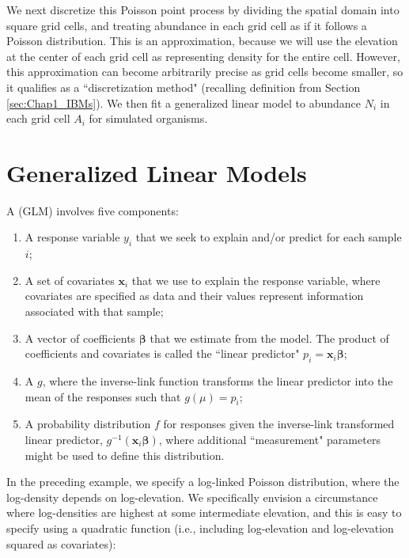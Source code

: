 We next discretize this Poisson point process by dividing the spatial domain into square grid cells, and treating abundance in each grid cell as if it follows a Poisson distribution.  This is an approximation, because we will use the elevation at the center of each grid cell as representing density for the entire cell.  However, this approximation can become arbitrarily precise as grid cells become smaller, so it qualifies as a ``discretization method" (recalling definition from Section \ref{sec:Chap1_IBMs}).  We then fit a generalized linear model to abundance \(N_i\) in each grid cell \(A_i\) for simulated organisms.  

\section{Generalized Linear Models} \label{sec:Chap1_GLM}

A  (GLM) involves five components:

\begin{enumerate}
    \item A response variable \(y_i\) that we seek to explain and/or predict for each sample \(i\);
    \item A set of covariates \( \mathbf{x}_i\) that we use to explain the response variable, where covariates are specified as data and their values represent information associated with that sample;
    \item A vector of coefficients \( \mathbf{\beta} \) that we estimate from the model.  The product of coefficients and covariates is called the ``linear predictor" \( p_i = \mathbf{x}_i \mathbf{\beta} \);
    \item A  \(g\), where the inverse-link function transforms the linear predictor into the mean of the responses such that \(g(\mu) = p_i\);
    \item A probability distribution \(f\) for responses given the inverse-link transformed linear predictor, \(g^{-1}(\mathbf{x}_i \mathbf{\beta})\), where additional ``measurement" parameters might be used to define this distribution.
\end{enumerate}

In the preceding example, we specify a log-linked Poisson distribution, where the log-density depends on log-elevation.  We specifically envision a circumstance where log-densities are highest at some intermediate elevation, and this is easy to specify using a quadratic function (i.e., including log-elevation and log-elevation squared as covariates):

